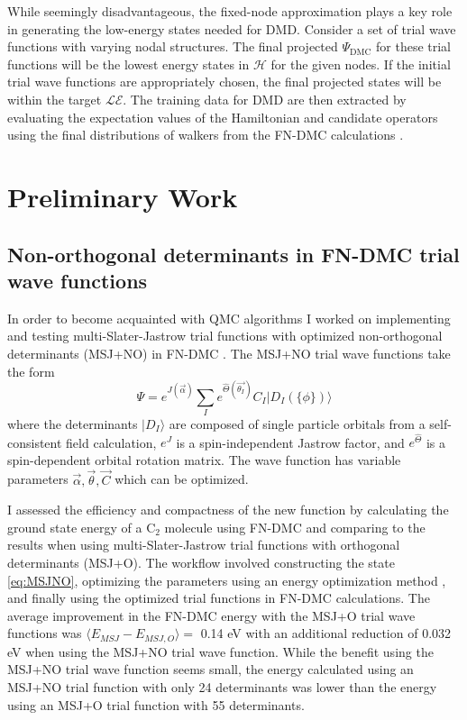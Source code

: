 \documentclass[12pt]{article}
\begin{document}
While seemingly disadvantageous, the fixed-node approximation plays
a key role in generating the low-energy states needed for DMD.
Consider a set of trial wave functions with varying nodal structures.
The final projected $\Psi_\text{DMC}$ for these trial functions will be the lowest energy states in $\mathcal{H}$ for the given nodes.
If the initial trial wave functions are appropriately chosen, the final projected states will be within the target $\mathcal{LE}$.
The training data for DMD are then extracted by evaluating the expectation values of the Hamiltonian and candidate operators using the final distributions of walkers from the FN-DMC calculations \cite{Wagner2017}.

\section{Preliminary Work}
\subsection{Non-orthogonal determinants in FN-DMC trial wave functions}
In order to become acquainted with QMC algorithms I worked on implementing and testing multi-Slater-Jastrow trial functions with optimized non-orthogonal determinants (MSJ+NO) in FN-DMC \cite{doi:10.1063/1.5052906}.
The MSJ+NO trial wave functions take the form
\begin{equation}
\Psi=e^{J(\vec{\alpha})} \sum_I e^{\hat{\Theta}(\vec{\theta_I})} C_I |D_I (\{ \phi\})\rangle
\label{eq:MSJNO}
\end{equation}
where the determinants $|D_I\rangle$ are composed of single particle orbitals from a self-consistent field calculation, $e^J$ is a spin-independent Jastrow factor, and $e^{\hat{\Theta}}$ is a spin-dependent orbital rotation matrix.
The wave function has variable parameters $\vec{\alpha}, \vec{\theta}, \vec{C}$ which can be optimized.

I assessed the efficiency and compactness of the new function by calculating the ground state energy of a C$_2$ molecule using FN-DMC and comparing to the results when using multi-Slater-Jastrow trial functions with orthogonal determinants (MSJ+O). 
The workflow involved constructing the state \eqref{eq:MSJNO}, optimizing the parameters using an energy optimization method \cite{Toulouse2007}, and finally using the optimized trial functions in FN-DMC calculations. 
The average improvement in the FN-DMC energy with the MSJ+O trial wave functions was $\langle E_{MSJ} - E_{MSJ,O}\rangle =$ 0.14 eV with an additional reduction of 0.032 eV when using the MSJ+NO trial wave function.
While the benefit using the MSJ+NO trial wave function seems small, the energy calculated using an MSJ+NO trial function with only 24 determinants was lower than the energy using an MSJ+O trial 
function with 55 determinants.
\end{document}
